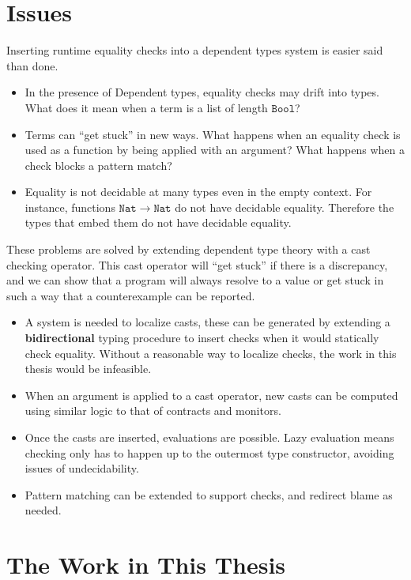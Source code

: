 \section{Issues}

Inserting runtime equality checks into a dependent types system is easier said than done.
\begin{itemize}
\item In the presence of Dependent types, equality checks may drift into types.
What does it mean when a term is a list of length $\mathtt{Bool}$?
\item Terms can ``get stuck'' in new ways. 
What happens when an equality check is used as a function by being applied with an argument?
What happens when a check blocks a pattern match?
\item Equality is not decidable at many types even in the empty context.
For instance, functions $\mathtt{Nat}\rightarrow\mathtt{Nat}$ do not have decidable equality.
Therefore the types that embed them do not have decidable equality.
\end{itemize}
These problems are solved by extending dependent type theory with a cast checking operator.
This cast operator will ``get stuck'' if there is a discrepancy, and we can show that a program will always resolve to a value or get stuck in such a way that a counterexample can be reported.
\begin{itemize}
\item A system is needed to localize casts, these can be generated by extending a \textbf{bidirectional} typing procedure to insert checks when it would statically check equality.
Without a reasonable way to localize checks, the work in this thesis would be infeasible.
\item When an argument is applied to a cast operator, new casts can be computed using similar logic to that of contracts and monitors\cite{10.1145/581478.581484}.
\item Once the casts are inserted, evaluations are possible.
Lazy evaluation means checking only has to happen up to the outermost type constructor, avoiding issues of undecidability.
\item Pattern matching can be extended to support checks, and redirect blame as needed.
\end{itemize}

\section{The Work in This Thesis}

